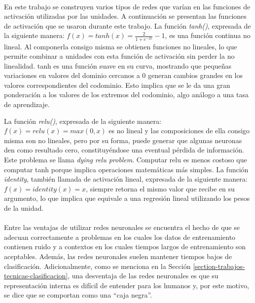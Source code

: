 \paragraph{}En este trabajo se construyen varios tipos de redes que varían en las funciones de activación utilizadas por las unidades.
A continuación se presentan las funciones de activación que se usaron durante este trabajo. 
La función \textit{tanh()}, expresada de la siguiente manera: $f(x) = tanh(x) = \frac{2}{1 + e^{-2x}} - 1 $, es una función continua no lineal.
Al componerla consigo misma se obtienen funciones no lineales, lo que permite combinar a unidades con esta función de activación sin perder la no linealidad. 
tanh es una función suave en su curva, mostrando que pequeñas variaciones en valores del dominio cercanos a 0 generan cambios grandes en los valores correspondientes del codominio.
Esto implica que se le da una gran ponderación a los valores de los extremos del codominio, algo análogo a una tasa de aprendizaje. 

La función \textit{relu()}, expresada de la siguiente manera: $f(x) = relu(x) = max(0, x)$ es no lineal y las composiciones de ella consigo misma son no lineales, pero por su forma, puede generar que algunas neuronas den como resultado cero, constituyéndose una eventual pérdida de información.
Este problema se llama \textit{dying relu problem}.
Computar relu es menos costoso que computar tanh porque implica operaciones matemáticas más simples.
La función \textit{identity}, también llamada de activación lineal, expresada de la siguiente manera: $f(x) = identity(x) = x$, siempre retorna el mismo valor que recibe en su argumento, lo que implica que equivale a una regresión lineal utilizando los pesos de la unidad.

\paragraph{}Entre las ventajas de utilizar redes neuronales se encuentra el hecho de que se adecuan correctamente a problemas en los cuales los datos de entrenamiento contienen ruido y a contextos en los cuales tiempos largos de entrenamiento son aceptables.
Además, las redes neuronales suelen mantener tiempos bajos de clasificación.
Adicionalmente, como se menciona en la Sección \ref{section-trabajos-tecnicas-clasificacion}, una desventaja de las redes neuronales es que su representación interna es difícil de entender para los humanos y, por este motivo, se dice que se comportan como una “caja negra”.
